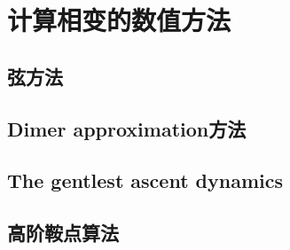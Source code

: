 \section{计算相变的数值方法}

\subsection{弦方法}

\subsection{Dimer approximation方法}

\subsection{The gentlest ascent dynamics}

\subsection{高阶鞍点算法}

